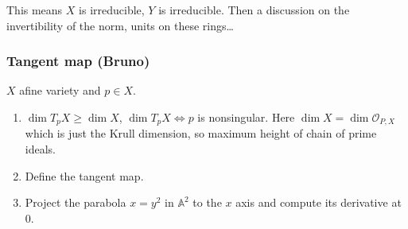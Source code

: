 \begin{enumerate}[label=\textbf{Step \arabic*}]
This means $X$ is irreducible, $Y$ is irreducible. Then a discussion on the invertibility of the norm, units on these rings…
\end{enumerate}

 \subsubsection{Tangent map (Bruno)}

\begin{manualexercise}{5.10}
$X$ afine variety and $p\in X$.
\begin{enumerate}[label=\alph*.]
	\item $\dim T_pX\geq \dim X$, $\dim T_pX\iff p$ is nonsingular. Here $\dim X=\dim \mathcal{O}_{P,X}$ which is just the Krull dimension, so maximum height of chain of prime ideals.
	\item Define the tangent map.

	\item Project the parabola $x=y^2$ in $\mathbb{A}^2$ to the  $x$ axis and compute its derivative at 0.
		\end{enumerate}
\end{manualexercise}

